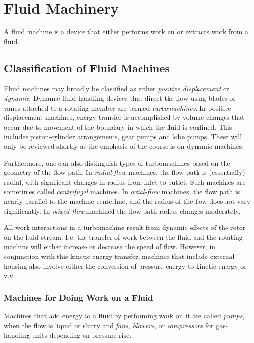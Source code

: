 
\section{Fluid Machinery}

\begin{definition}
  A fluid machine is a device that either performs work on or extracts work from a fluid.
\end{definition}

\subsection{Classification of Fluid Machines}
Fluid machines may broadly be classified as either \textit{positive displacement} or \textit{dynamic}.
Dynamic fluid-handling devices that direct the flow using blades or vanes attached to a rotating member are termed \textit{turbomachines}.
In positive-displacement machines, energy transfer is accomplished by volume changes that occur due to movement of the boundary in which the fluid is confined.
This includes piston-cylinder arrangements, gear pumps and lobe pumps.
These will only be reviewed shortly as the emphasis of the course is on dynamic machines.

Furthermore, one can also distinguish types of turbomachines based on the geometry of the flow path.
In \textit{radial-flow} machines, the flow path is (essentially) radial, with significant changes in radius from inlet to outlet.
Such machines are sometimes called \textit{centrifugal} machines.
In \textit{axial-flow} machines, the flow path is nearly parallel to the machine centerline, and the radius of the flow does not vary significantly.
In \textit{mixed-flow} machined the flow-path radius changes moderately.

All work interactions in a turbomachine result from dynamic effects of the rotor on the fluid stream. I.e. the transfer of work between the fluid and the rotating machine will either increase or decrease the speed of flow.
However, in conjunction with this kinetic energy transfer, machines that include external housing also involve either the conversion of pressure energy to kinetic energy or v.v.

\subsubsection{Machines for Doing Work on a Fluid}
Machines that add energy to a fluid by performing work on it are called \textit{pumps}, when the flow is liquid or slurry and \textit{fans}, \textit{blowers}, or \textit{compressors} for gas-handling units depending on pressure rise.

